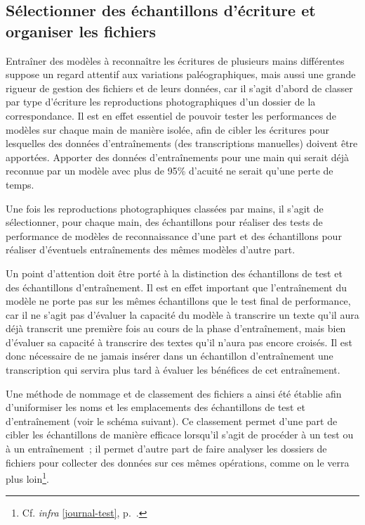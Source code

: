 \documentclass[a4paper,12pt,twoside]{book}
\begin{document}
			\subsection{Sélectionner des échantillons d'écriture et organiser les fichiers}
				Entraîner des modèles à reconnaître les écritures de plusieurs mains différentes suppose un regard attentif aux variations paléographiques, mais aussi une grande rigueur de gestion des fichiers et de leurs données, car il s'agit d'abord de classer par type d'écriture les reproductions photographiques d'un dossier de la correspondance. Il est en effet essentiel de pouvoir tester les performances de modèles sur chaque main de manière isolée, afin de cibler les écritures pour lesquelles des données d'entraînements (des transcriptions manuelles) doivent être apportées. Apporter des données d'entraînements pour une main qui serait déjà reconnue par un modèle avec plus de 95\% d'acuité ne serait qu'une perte de temps.
				
				Une fois les reproductions photographiques classées par mains, il s'agit de sélectionner, pour chaque main, des échantillons pour réaliser des tests de performance de modèles de reconnaissance d'une part et des échantillons pour réaliser d'éventuels entraînements des mêmes modèles d'autre part.
				
				Un point d'attention doit être porté à la distinction des échantillons de test et des échantillons d'entraînement. Il est en effet important que l'entraînement du modèle ne porte pas sur les mêmes échantillons que le test final de performance, car il ne s'agit pas d'évaluer la capacité du modèle à transcrire un texte qu'il aura déjà transcrit une première fois au cours de la phase d'entraînement, mais bien d'évaluer sa capacité à transcrire des textes qu'il n'aura pas encore croisés. Il est donc nécessaire de ne jamais insérer dans un échantillon d'entraînement une transcription qui servira plus tard à évaluer les bénéfices de cet entraînement.
				
				Une méthode de nommage et de classement des fichiers a ainsi été établie afin d'uniformiser les noms et les emplacements des échantillons de test et d'entraînement (voir le schéma suivant). Ce classement permet d'une part de cibler les échantillons de manière efficace lorsqu'il s'agit de procéder à un test ou à un entraînement~; il permet d'autre part de faire analyser les dossiers de fichiers pour collecter des données sur ces mêmes opérations, comme on le verra plus loin\footnote{Cf. \textit{infra} \ref{journal-test}, p.~\pageref{journal-test}.}.
				
\end{document}
